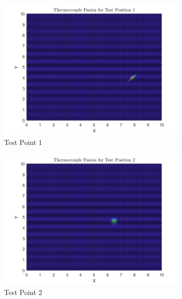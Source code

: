 \documentclass[12pt]{article}
\begin{document}
\begin{figure}[H]
    \centering
    \begin{subfigure}[h]{0.45\textwidth}
        \includegraphics[width=\textwidth]{images/ThermocoupleFusionA1.png}
        \caption{Test Point 1}
        \label{fig:TC-Fus-1}
    \end{subfigure}
    \begin{subfigure}[h]{0.45\textwidth}
        \includegraphics[width=\textwidth]{images/ThermocoupleFusionA2.png}
        \caption{Test Point 2}
        \label{fig:TC-Fus-2}
    \end{subfigure}
    \begin{subfigure}[h]{0.45\textwidth}

\end{subfigure}
\end{figure}
\end{document}
